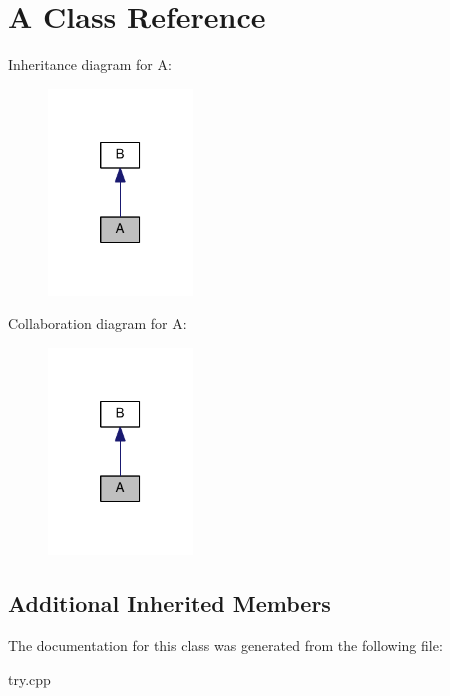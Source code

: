 \hypertarget{classA}{}\section{A Class Reference}
\label{classA}


Inheritance diagram for A\+:
\nopagebreak
\begin{figure}[H]
\begin{center}
\leavevmode
\includegraphics[width=109pt]{classA__inherit__graph}
\end{center}
\end{figure}


Collaboration diagram for A\+:
\nopagebreak
\begin{figure}[H]
\begin{center}
\leavevmode
\includegraphics[width=109pt]{classA__coll__graph}
\end{center}
\end{figure}
\subsection*{Additional Inherited Members}


The documentation for this class was generated from the following file\+:\begin{DoxyCompactItemize}
\item 
try.\+cpp\end{DoxyCompactItemize}
